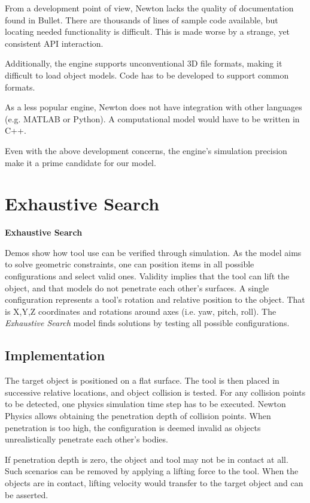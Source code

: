 \documentclass[11]{article}
\let \shorttitle \textbf
\begin{document}
From a development point of view, Newton lacks the quality of documentation found in Bullet. 
There are thousands of lines of sample code available, but locating needed functionality is difficult. 
This is made worse by a strange, yet consistent API interaction.

Additionally, the engine supports unconventional 3D file formats, making it difficult to load object models.
Code has to be developed to support common formats.

As a less popular engine, Newton does not have integration with other languages (e.g. MATLAB or Python). 
A computational model would have to be written in C++.

Even with the above development concerns, the engine's simulation precision make it a prime candidate for our model.  

\section{Exhaustive Search}

\shorttitle{Exhaustive Search}

Demos show how tool use can be verified through simulation.
As the model aims to solve geometric constraints, one can position items in all possible configurations and select valid ones. 
Validity implies that the tool can lift the object, and that models do not penetrate each other's surfaces.
A single configuration represents a tool's rotation and relative position to the object.
That is X,Y,Z coordinates and rotations around axes (i.e. yaw, pitch, roll). 
The \emph{Exhaustive Search} model finds solutions by testing all possible configurations.

\subsection{Implementation}
The target object is positioned on a flat surface. 
The tool is then placed in successive relative locations, and object collision is tested. 
For any collision points to be detected, one physics simulation time step has to be executed.
Newton Physics allows obtaining the penetration depth of collision points. 
When penetration is too high, the configuration is deemed invalid as objects unrealistically penetrate each other's bodies.

If penetration depth is zero, the object and tool may not be in contact at all. 
Such scenarios can be removed by applying a lifting force to the tool.
When the objects are in contact, lifting velocity would transfer to the target object and can be asserted. 
\end{document}
